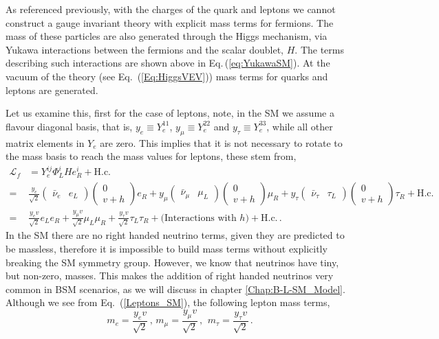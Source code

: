 \documentclass[10pt]{report}
\begin{document}
As referenced previously, with the charges of the quark and leptons we cannot construct a gauge invariant theory with explicit mass terms for fermions. The mass of these particles are also generated through the Higgs mechanism, via Yukawa interactions between the fermions and the scalar doublet, $H$. The terms describing such interactions are shown above in Eq.\,(\ref{eq:YukawaSM}). At the vacuum of the theory (see Eq.~(\ref{Eq:HiggsVEV})) mass terms for quarks and leptons are generated. 

Let us examine this, first for the case of leptons, note, in the SM we assume a flavour diagonal basis, that is,  $y_e \equiv Y_e^{11}$, $y_\mu \equiv Y_e^{22}$ and $y_\tau \equiv Y_e^{33}$, while all other matrix elements in $Y_e$ are zero. This implies that it is not necessary to rotate to the mass basis to reach the mass values for leptons, these stem from,
\begin{equation}
\label{Leptons_SM}
\begin{split}
\mathcal{L}_{f} & = Y_e^{ij} \Phi_L^i H e_R^i + \text{H.c.}\, \\ 
= &  \frac{y_e}{\sqrt{2}} \begin{pmatrix} \bar{\nu}_e & e_L \end{pmatrix} \begin{pmatrix} 0 \\ v+h \end{pmatrix} e_R + y_\mu  \begin{pmatrix} \bar{\nu}_\mu & \mu_L \end{pmatrix} \begin{pmatrix} 0 \\ v+h \end{pmatrix} \mu_R + y_\tau  \begin{pmatrix} \bar{\nu}_\tau & \tau_L \end{pmatrix} \begin{pmatrix} 0 \\ v+h \end{pmatrix} \tau_R + \text{H.c.} \,  \\ 
= & \frac{y_e v}{\sqrt{2}} e_L e_R + \frac{y_\mu v}{\sqrt{2}} \mu_L \mu_R + \frac{y_\tau v}{\sqrt{2}} \tau_L \tau_R + \big(\text{Interactions with }h\big) + \text{H.c.} \, .
\end{split} 
\end{equation}
%
In the SM there are no right handed neutrino terms, given they are predicted to be massless, therefore it is impossible to build mass terms without explicitly breaking the SM symmetry group. However, we know that neutrinos have tiny, but non-zero, masses. This makes the addition of right handed neutrinos very common in BSM scenarios, as we will discuss in chapter \ref{Chap:B-L-SM_Model}. 
%
Although we see from Eq.~(\ref{Leptons_SM}), the following lepton mass terms,
\begin{equation}	
\ m_e = \frac{y_e v}{\sqrt{2}} \,,\, m_\mu = \frac{y_\mu v}{\sqrt{2}} \,,\, \ m_\tau = \frac{y_\tau v}{\sqrt{2}} \,.
\end{equation}
\end{document}
